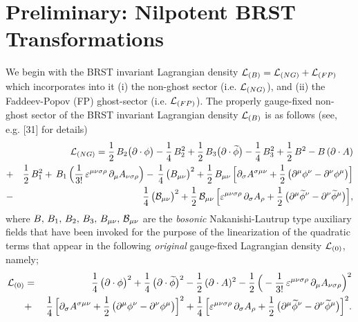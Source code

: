 \documentclass[12pt]{article}
\begin{document}




\section{Preliminary: Nilpotent BRST Transformations}



We begin with the BRST invariant Lagrangian density ${\cal L}_{(B)} = {\cal L}_{(NG)} + {\cal L}_{(FP)}$ which incorporates
into it  (i) the non-ghost sector
(i.e. ${\cal L}_{(NG)} $), and (ii) the Faddeev-Popov (FP) ghost-sector (i.e. ${\cal L}_{(FP)} $). The properly gauge-fixed non-ghost sector of the 
BRST invariant Lagrangian density ${\cal L}_{(B)} $ is as follows (see, e.g. [31] for details) 
\begin{eqnarray}\label{1}
&&{\cal L}_{(NG)}  = \dfrac{1}{2}\, B_2 \big (\partial \cdot \phi \big ) - \dfrac{1}{4}\, B_2^2  + 
\dfrac{1}{2}\, B_3 \big (\partial \cdot \widetilde \phi \big ) - \dfrac{1}{4}\, B_3^2 
+ \dfrac{1}{2}\, B^2 - B \, (\partial \cdot A) \nonumber\\
&+&  \dfrac{1}{2} \, B_1^2 
+ \, B_1\, \Big(\dfrac{1}{3!}\,\varepsilon^{\mu\nu\sigma\rho} \,\partial_\mu A_{\nu\sigma\rho} \Big) 
 - \,\dfrac{1}{4} \, \big( B_{\mu\nu} \big)^2 + \dfrac{1}{2}\, B_{\mu\nu} \, \Big[\partial_\sigma A^{\sigma\mu\nu}
+ \dfrac{1}{2}\, \big (\partial^\mu \phi^\nu - \partial^\nu \phi^\mu \big) \Big ]  
   \nonumber\\
&-& \dfrac{1}{4}\, \big( {\cal B_{\mu\nu}} \big)^2 + \dfrac{1}{2} \, {\cal B_{\mu\nu}}\, \Big[ \varepsilon^{\mu\nu\sigma\rho} \,\partial_\sigma A_\rho 
+ \dfrac{1}{2}\, \big (\partial^\mu \widetilde \phi^\nu - \partial^\nu \widetilde \phi^\mu \big) \Big], 
 \end{eqnarray}
where $B,\, B_1,\, B_2,\, B_3,\, B_{\mu\nu},\, {\cal B_{\mu\nu}} $ are the {\it bosonic} Nakanishi-Lautrup type auxiliary fields that have been 
invoked for the purpose of the linearization of the quadratic terms that appear in the 
following {\it original} gauge-fixed Lagrangian density ${\cal L}_{(0)}$, namely; 
\begin{eqnarray}\label{2}
{\cal L}_{(0)}  &=& \dfrac{1}{4}\,  \big (\partial \cdot \phi \big )^2 + \dfrac{1}{4}\, \big (\partial \cdot \widetilde \phi \big )^2
- \dfrac{1}{2}\,(\partial \cdot A)^2  -  \dfrac{1}{2} \, \Big(- \dfrac{1}{3!}\,\varepsilon^{\mu\nu\sigma\rho} \,\partial_\mu A_{\nu\sigma\rho} \Big)^2  \nonumber\\
 &+& \,\dfrac{1}{4} \, \Big[\partial_\sigma A^{\sigma\mu\nu}
+ \dfrac{1}{2}\, \big (\partial^\mu \phi^\nu - \partial^\nu \phi^\mu \big) \Big ]^2  +    
 \dfrac{1}{4}\, \Big[ \varepsilon^{\mu\nu\sigma\rho} \,\partial_\sigma A_\rho 
+ \dfrac{1}{2}\, \big (\partial^\mu \widetilde \phi^\nu - \partial^\nu \widetilde \phi^\mu \big) \Big]^2.
\end{eqnarray}
\end{document}
